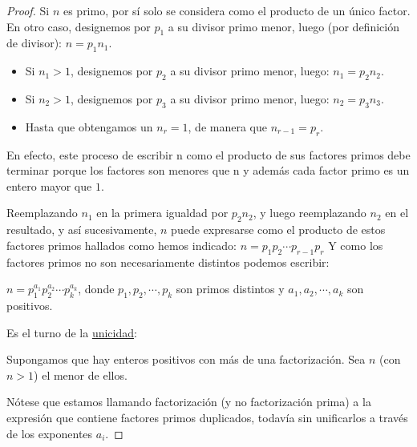\begin{proof} Si $n$ es primo, por sí solo se considera como el producto de un único factor. \\ 
En otro caso, designemos por $p_1$ a su divisor primo menor, luego (por definición de divisor): $n = p_1n_1$. 
\begin{itemize}
    \item Si $n_1 > 1$, designemos por $p_2$ a su divisor primo menor, luego:  $n_1= p_2 n_2$.
    \item Si $n_2 > 1$, designemos por $p_3$ a su divisor primo menor, luego:  $n_2 = p_3 n_3$. 
    \item Hasta que obtengamos un $n_r = 1$, de manera que $n_{r-1} = p_r$.
\end{itemize}

En efecto, este proceso de escribir n como el producto de sus factores primos debe terminar porque los factores son menores que n y además cada factor primo es un entero mayor que $1$. 

Reemplazando $n_1$ en la primera igualdad por $p_2 n_2$, y luego reemplazando $n_2$ en el resultado, y así sucesivamente, $n$ puede expresarse como el producto de estos factores primos hallados como hemos indicado: $n = p_1 p_2 \cdots p_{r-1} p_r$ 
Y como los factores primos no son necesariamente distintos podemos escribir: 

$n = p_1^{a_1} p_2^{a_2} \cdots p_k^{a_k}$, donde $p_1, p_2, \cdots, p_k$ son primos distintos y $a_1, a_2, \cdots, a_k$ son positivos. 

Es el turno de la \underline{unicidad}: 

Supongamos que hay enteros positivos con más de una factorización. Sea $n$ (con $n > 1$) el menor de ellos. 

Nótese que estamos llamando factorización (y no factorización prima) a la expresión que contiene factores primos duplicados, todavía sin unificarlos a través de los exponentes $a_i$.


\end{proof}
